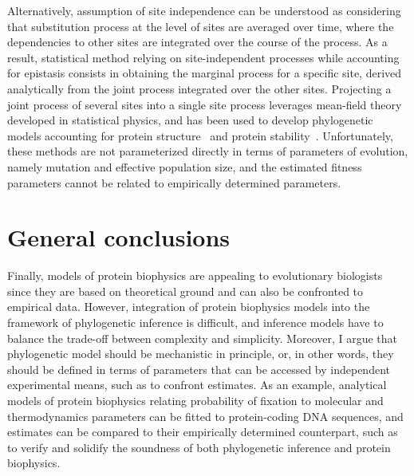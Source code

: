 Alternatively, assumption of site independence can be understood as considering that substitution process at the level of sites are averaged over time, where the dependencies to other sites are integrated over the course of the process.
As a result, statistical method relying on site-independent processes while accounting for epistasis consists in obtaining the marginal process for a specific site, derived analytically from the joint process integrated over the other sites.
Projecting a joint process of several sites into a single site process leverages mean-field theory developed in statistical physics, and has been used to develop phylogenetic models accounting for protein structure~\citep{Chi2018} and protein stability~\citep{Arenas2015a, Arenas2017}.
Unfortunately, these methods are not parameterized directly in terms of parameters of evolution, namely mutation and effective population size, and the estimated fitness parameters cannot be related to empirically determined parameters.

\section{General conclusions}

Finally, models of protein biophysics are appealing to evolutionary biologists since they are based on theoretical ground and can also be confronted to empirical data.
However, integration of protein biophysics models into the framework of phylogenetic inference is difficult, and inference models have to balance the trade-off between complexity and simplicity.
Moreover, I argue that phylogenetic model should be mechanistic in principle, or, in other words, they should be defined in terms of parameters that can be accessed by independent experimental means, such as to confront estimates.
As an example, analytical models of protein biophysics relating probability of fixation to molecular and thermodynamics parameters can be fitted to protein-coding DNA sequences, and estimates can be compared to their empirically determined counterpart, such as to verify and solidify the soundness of both phylogenetic inference and protein biophysics.
